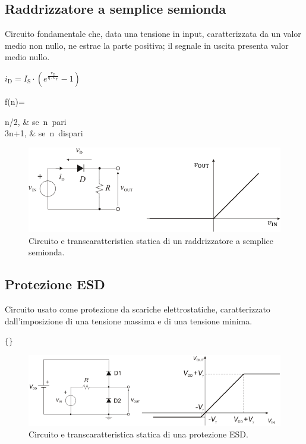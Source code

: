 \documentclass[a4paper]{article}
\begin{document}
{{		\subsection{Raddrizzatore a semplice semionda}
			Circuito fondamentale che, data una tensione in input, caratterizzata da un valor medio non nullo, ne estrae la parte positiva; il segnale in uscita presenta valor medio nullo.
			\newline
			\begin{center}
				$ i_{\mathrm{D}} = I_{\mathrm{S}} \cdot (e^{\mathrm{\frac{v_{\mathrm{D}}}{\eta \cdot V_{\mathrm{T}}}}} - 1) $
			\end{center}
			f(n)=
			\begin{cases}
				n/2, & \mbox{se }n\mbox{ pari} \\ 3n+1, & \mbox{se }n\mbox{ dispari}
			\end{cases} 
			\begin{figure}[h!]
				\centering
				\includegraphics[scale=0.7]{transcaratteristicaStaticaRaddrizzatoreASempliceSemionda}
				\caption{Circuito e transcaratteristica statica di un raddrizzatore a semplice semionda.}
				\label{fig:transcaratteristicaStaticaRaddrizzatoreASempliceSemionda}
			\end{figure}
		\subsection{Protezione ESD}
			Circuito usato come protezione da scariche elettrostatiche, caratterizzato dall'imposizione di una tensione massima e di una tensione minima.
			\newline
			\begin{center}
				$ \Biggl\{ \Biggr\} $
			\end{center}
			\begin{figure}[h!]
				\centering
				\includegraphics[scale=0.7]{transcaratteristicaStaticaProtezioneESD}
				\caption{Circuito e transcaratteristica statica di una protezione ESD.}
				\label{fig:transcaratteristicaStaticaProtezioneESD}
			\end{figure}
}}
\end{document}
